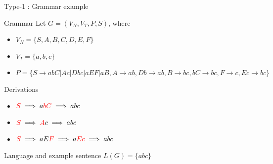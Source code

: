 \documentclass{beamer}
\begin{document}
\begin{frame}{Type-1 : Grammar example}
	\begin{block}{Grammar}
		Let $G = (V_N, V_T, P, S)$, where 
		\begin{itemize}
			\item $V_N = \{S, A, B, C, D, E, F\}$
			\item $V_T = \{a, b, c\}$
			\item $P = \{S\rightarrow abC | Ac | Dbc | aEF | aB, A \rightarrow ab, Db \rightarrow ab, B \rightarrow bc, bC \rightarrow bc, F \rightarrow c, Ec \rightarrow bc \}$
		\end{itemize}
	\end{block}
	
	\begin{block}{Derivations}
		\begin{itemize}
			\item $\textcolor{red}{S}\implies a\textcolor{red}{bC} \implies abc$
			\item $\textcolor{red}{S}\implies \textcolor{red}{A}c \implies abc$
			\item $\textcolor{red}{S}\implies aE\textcolor{red}{F} \implies a\textcolor{red}{Ec} \implies abc$
		\end{itemize}
	\end{block}
	
	\begin{exampleblock}{Language and example sentence}
		$L(G) = \{abc\}$
	\end{exampleblock}

\end{frame}

\end{document}
